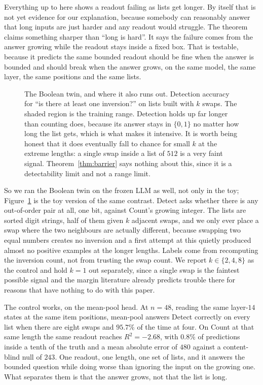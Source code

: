 \documentclass[10pt]{article}
\theoremstyle{definition}
\begin{document}
Everything up to here shows a readout failing as lists get longer. By
itself that is not yet evidence for our explanation, because somebody can
reasonably answer that long inputs are just harder and any readout would
struggle. The theorem claims something sharper than ``long is hard''. It
says the failure comes from the answer growing while the readout stays
inside a fixed box. That is testable, because it predicts the same bounded
readout should be fine when the answer is bounded and should break when the
answer grows, on the same model, the same layer, the same positions and
the same lists.

\begin{figure}[htbp]
\centering

\caption{The Boolean twin, and where it also runs out. Detection accuracy
for ``is there at least one inversion?'' on lists built with $k$ swaps.
The shaded region is the training range. Detection holds up far longer
than counting does, because its answer stays in $\{0,1\}$ no matter how
long the list gets, which is what makes it intensive. It is worth being
honest that it does eventually fall to chance for small $k$ at the extreme
lengths: a single swap inside a list of $512$ is a very faint signal.
Theorem~\ref{thm:barrier} says nothing about this, since it is a
detectability limit and not a range limit.}
\label{fig:twin}
\end{figure}

So we ran the Boolean twin on the frozen LLM as well, not only in the toy;
Figure~\ref{fig:twin} is the toy version of the same contrast.
Detect asks whether there is any out-of-order pair at all, one bit, against
Count's growing integer. The lists are sorted digit strings, half of them
given $k$ adjacent swaps, and we only ever place a swap where the two neighbours are actually different, because swapping two equal numbers
creates no inversion and a first attempt at this quietly produced almost no positive examples at the longer lengths. Labels come from recomputing
the inversion count, not from trusting the swap count. We report $k \in
\{2,4,8\}$ as the control and hold $k = 1$ out separately, since a single
swap is the faintest possible signal and the margin literature already
predicts trouble there for reasons that have nothing to do with this paper.

The control works, on the mean-pool head. At $n = 48$, reading the same
layer-$14$ states at the same item positions, mean-pool answers Detect
correctly on every list when there are eight swaps and $95.7\%$ of the time
at four. On Count at that same length the same readout reaches $R^2 =
-2.68$, with $0.8\%$ of predictions inside a tenth of the truth and a mean
absolute error of $480$ against a content-blind null of $243$. One readout,
one length, one set of lists, and it answers the bounded question while
doing worse than ignoring the input on the growing one. What separates them
is that the answer grows, not that the list is long.
\end{document}
